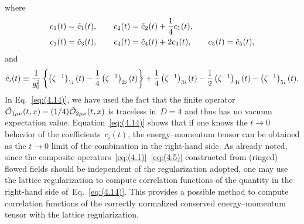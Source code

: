 where
\begin{align}
   &c_1(t)=\Tilde{c}_1(t),\qquad
   c_2(t)=\Tilde{c}_2(t)+\frac{1}{4}c_1(t),
\notag\\
   &c_3(t)=\Tilde{c}_3(t),\qquad
   c_4(t)=\Tilde{c}_4(t)+2c_3(t),\qquad
   c_5(t)=\Tilde{c}_5(t),
\label{eq:(4.15)}
\end{align}
and
\begin{equation}
   \Tilde{c}_i(t)\equiv\frac{1}{g_0^2}\left\{
   \left(\zeta^{-1}\right)_{1i}(t)
   -\frac{1}{4}\left(\zeta^{-1}\right)_{2i}(t)\right\}
   +\frac{1}{4}\left(\zeta^{-1}\right)_{3i}(t)
   -\frac{1}{2}\left(\zeta^{-1}\right)_{4i}(t)
   -\left(\zeta^{-1}\right)_{5i}(t).
\label{eq:(4.16)}
\end{equation}
In Eq.~\eqref{eq:(4.14)}, we have used the fact that the finite operator
$\Tilde{\mathcal{O}}_{1\mu\nu}(t,x)-(1/4)\Tilde{\mathcal{O}}_{2\mu\nu}(t,x)$ is
traceless in~$D=4$ and thus has no vacuum expectation value.
Equation~\eqref{eq:(4.14)} shows that if one knows the $t\to0$ behavior of the
coefficients~$c_i(t)$, the energy--momentum tensor can be obtained as the
$t\to0$ limit of the combination in the right-hand side. As already noted,
since the composite operators~\eqref{eq:(4.1)}--\eqref{eq:(4.5)} constructed
from (ringed) flowed fields should be independent of the regularization
adopted, one may use the lattice regularization to compute correlation
functions of the quantity in the right-hand side of~Eq.~\eqref{eq:(4.14)}. This
provides a possible method to compute correlation functions of the
correctly normalized conserved energy--momentum tensor with the lattice
regularization.

